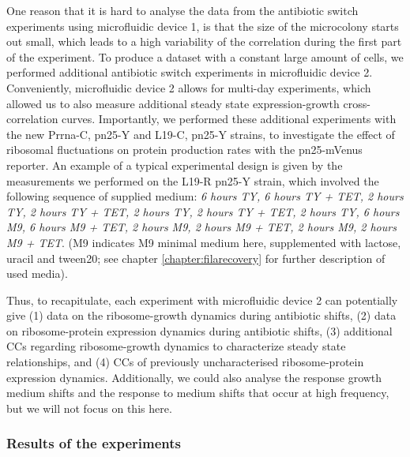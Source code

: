 One reason that it is hard to analyse the data from the antibiotic switch experiments using microfluidic device 1, 
is
that the size of the microcolony starts out small, which leads to a 
high variability of the correlation during the first part of the experiment.
%
To produce a dataset with a constant large amount of cells, we performed additional antibiotic switch experiments in microfluidic device 2.
%
Conveniently, microfluidic device 2 allows for multi-day experiments, which allowed us 
to also measure additional steady state expression-growth cross-correlation curves. %
%
Importantly, we performed these additional experiments with the new Prrna-C, pn25-Y and L19-C, pn25-Y strains, to investigate the effect of ribosomal fluctuations on protein production rates with the pn25-mVenus reporter.
%
An example of a typical 
experimental design is given by the measurements we performed on the L19-R pn25-Y strain, which involved the following sequence of supplied medium: \textit{6 hours TY, 6 hours TY + TET, 2 hours TY, 2 hours TY + TET, 2 hours TY, 2 hours TY + TET, 2 hours TY, 6 hours M9, 6 hours M9 + TET, 2 hours M9, 2 hours M9 + TET, 2 hours M9, 2 hours M9 + TET}. (M9 indicates M9 minimal medium here, supplemented with lactose, uracil and tween20; see chapter \ref{chapter:filarecovery} for further description of used media). 
%

Thus, to recapitulate, each experiment with microfluidic device 2 can potentially give (1) data on the ribosome-growth dynamics during antibiotic shifts, (2) data on ribosome-protein expression dynamics during antibiotic shifts, (3) additional CCs regarding ribosome-growth dynamics to characterize steady state relationships, and (4) CCs of previously uncharacterised ribosome-protein expression dynamics. 
Additionally, we could also analyse the response growth medium shifts and the response to medium shifts that occur at high frequency, but we will not focus on this here.


\subsubsection{Results of the experiments}

